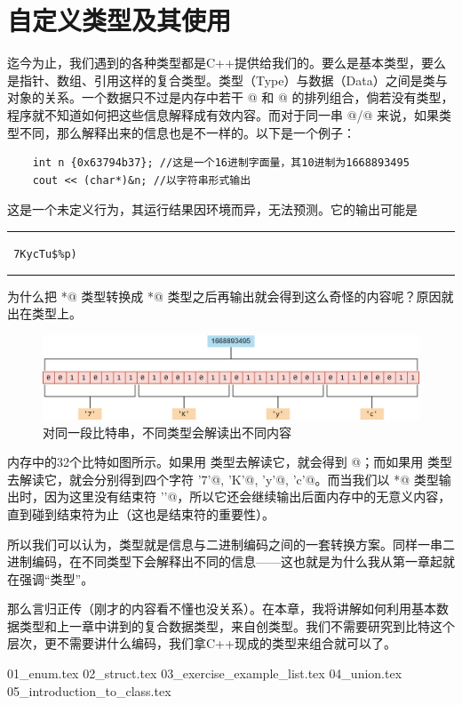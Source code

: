 \chapter{自定义类型及其使用}
迄今为止，我们遇到的各种类型都是C++提供给我们的。要么是基本类型，要么是指针、数组、引用这样的复合类型。类型（Type）与数据（Data）之间是类与对象的关系。一个数据只不过是内存中若干 @ 和 @ 的排列组合，倘若没有类型，程序就不知道如何把这些信息解释成有效内容。而对于同一串 @/@ 来说，如果类型不同，那么解释出来的信息也是不一样的。以下是一个例子：
\begin{lstlisting}
    int n {0x63794b37}; //这是一个16进制字面量，其10进制为1668893495
    cout << (char*)&n; //以字符串形式输出
\end{lstlisting}
这是一个未定义行为，其运行结果因环境而异，无法预测。它的输出可能是\\\noindent\rule{\linewidth}{.2pt}\texttt{
7KycTu\$\%p)
}\\\noindent\rule{\linewidth}{.2pt}
为什么把 \lstinline@int*@ 类型转换成 \lstinline@char*@ 类型之后再输出就会得到这么奇怪的内容呢？原因就出在类型上。\par
\begin{figure}[htbp]
    \centering
    \includegraphics[width=\textwidth]{../images/generalized_parts/06_0_1_string_to_int_or_char.drawio.png}
    \caption{对同一段比特串，不同类型会解读出不同内容}
\end{figure}
内存中的32个比特如图所示。如果用 \lstinline@int@ 类型去解读它，就会得到 @；而如果用 \lstinline@char@ 类型去解读它，就会分别得到四个字符 \lstinline@'7'@, \lstinline@'K'@, \lstinline@'y'@, \lstinline@'c'@。而当我们以 \lstinline@char*@ 类型输出时，因为这里没有结束符 \lstinline@'\0'@，所以它还会继续输出后面内存中的无意义内容，直到碰到结束符为止（这也是结束符的重要性）。\par
所以我们可以认为，类型就是信息与二进制编码之间的一套转换方案。同样一串二进制编码，在不同类型下会解释出不同的信息——这也就是为什么我从第一章起就在强调``类型''。\par
那么言归正传（刚才的内容看不懂也没关系）。在本章，我将讲解如何利用基本数据类型和上一章中讲到的复合数据类型，来自创类型。我们不需要研究到比特这个层次，更不需要讲什么编码，我们拿C++现成的类型来组合就可以了。\par
{01_enum.tex}
{02_struct.tex}
{03_exercise_example_list.tex}
{04_union.tex}
{05_introduction_to_class.tex}
